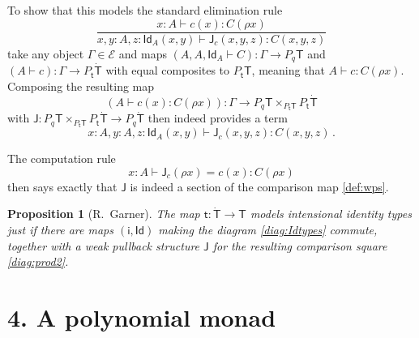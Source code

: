 \documentclass[12pt,reqno]{amsart}
\newcommand{\ednote}[1]{[\textit{\color{red}{#1}}]} %
\newcommand{\DD}{\ensuremath{\mathcal{D}}}
\newcommand{\EE}{\ensuremath{\mathcal{E}}}
\newcommand{\alg}[1]{\ensuremath{\mathsf{#1}}}
\renewcommand{\to}{\ensuremath{\rightarrow}}
\newcommand{\Id}{\mathsf{Id}}
\renewcommand{\t}{\ensuremath{\mathsf{t}}}
\newcommand{\T}{\ensuremath{\mathsf{T}}}
\newcommand{\TT}{\ensuremath{\dot{\mathsf{T}}}}
\newtheorem{proposition}[theorem]{Proposition}
\theoremstyle{remark}
\theoremstyle{definition}
\begin{document}
To show that this models the standard elimination rule
\[
\frac{x:A\vdash c(x) : C(\rho x)}{x, y:A, z : \Id_A(x, y)\vdash \mathsf{J}_c(x,y,z) : C(x,y,z)}
\]
take any object $\Gamma \in \EE$  and maps $(A, A, \Id_{A} \vdash C) : \Gamma \to P_q\T$ and $(A \vdash c) : \Gamma \to P_\t\TT$ with equal composites to $P_\t\T$, meaning that $A \vdash c : C(\rho x)$.  Composing the resulting map 
\[
(A\vdash c(x):C(\rho x)) : \Gamma \to P_q\T \times_{P_\t\T} P_\t\TT
\]
with $\mathsf{J} : P_q\T \times_{P_\t\T} P_\t\TT \to P_q \TT$ then indeed provides a term $$x:A, y:A, z:\Id_{A}(x,y)  \vdash \mathsf{J}_c(x,y,z) : C(x,y,z)\,.$$

The computation rule
\[
x: A \vdash \mathsf{J}_c(\rho x) = c(x) : C(\rho x)
\]
then says exactly that $\mathsf{J}$ is indeed a section of the comparison map \eqref{def:wps}.

\begin{proposition}[R.\ Garner] The map $\t : \TT \to \T$ models intensional \emph{identity types} just if there are maps $(\mathsf{i}, \Id)$ making the diagram \eqref{diag:Idtypes} commute, together with a weak pullback structure $\mathsf{J}$ for the resulting comparison square \eqref{diag:prod2}.
\end{proposition}



\section*{4. A polynomial monad}\label{sec:Monad}
%
%
%
\end{document}
